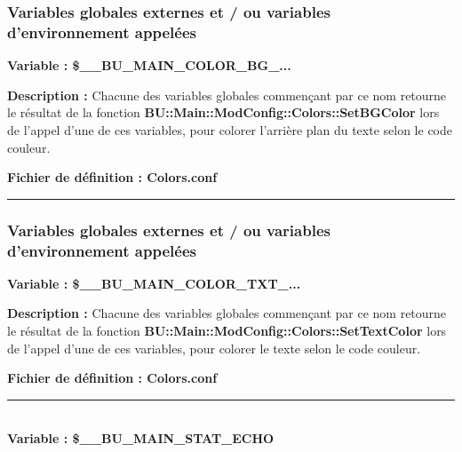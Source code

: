 \documentclass[a4paper,10pt]{article}
\begin{document}
\color{blue}
\subsubsection{Variables globales externes et / ou variables d'environnement appelées}\color{white}

\textbf{Variable : \color{orange}\$\_\_BU\_MAIN\_COLOR\_BG\_...}\\[1\baselineskip]

\begin{justify}
    \textbf{Description :} Chacune des variables globales commençant par ce nom retourne le résultat de la fonction \textbf{\color{mauve}BU::Main::ModConfig::Colors::SetBGColor} lors de l'appel d'une de ces variables, pour colorer l'arrière plan du texte selon le code couleur.
\end{justify}

\textbf{Fichier de définition : \color{lime}Colors.conf}\\[1\baselineskip]



\color{blue}\par\noindent\rule{\textwidth}{0.4pt}\color{white}

\color{blue}
\subsubsection{Variables globales externes et / ou variables d'environnement appelées}\color{white}

\textbf{Variable : \color{orange}\$\_\_BU\_MAIN\_COLOR\_TXT\_...}\\[1\baselineskip]

\begin{justify}
    \textbf{Description :} Chacune des variables globales commençant par ce nom retourne le résultat de la fonction \textbf{\color{mauve}BU::Main::ModConfig::Colors::SetTextColor} lors de l'appel d'une de ces variables, pour colorer le texte selon le code couleur.
\end{justify}

\textbf{Fichier de définition : \color{lime}Colors.conf}\\[1\baselineskip]



\color{orange}\par\noindent\rule{\textwidth}{0.4pt}\color{white}\\[1\baselineskip]

\textbf{Variable : \color{orange}\$\_\_BU\_MAIN\_STAT\_ECHO}\\[1\baselineskip]
\end{document}
